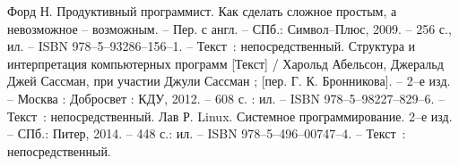 \begin{thebibliography}{9}
		Форд Н. Продуктивный программист. Как сделать сложное простым, а невозможное – возможным. – Пер. с англ. – СПб.: Символ–Плюс, 2009. – 256 с., ил. – ISBN 978–5–93286–156–1. – Текст~: непосредственный.    
	 Структура и интерпретация компьютерных программ [Текст] / Харольд Абельсон, Джеральд Джей Сассман, при участии Джули Сассман ; [пер. Г. К. Бронникова]. – 2–е изд. – Москва : Добросвет : КДУ, 2012. – 608 с. : ил. – ISBN 978–5–98227–829–6. – Текст~: непосредственный.    
		Лав Р. Linux. Системное программирование. 2–е изд. – СПб.: Питер, 2014. – 448 с.: ил. – ISBN 978–5–496–00747–4. – Текст~: непосредственный.
\end{thebibliography}
